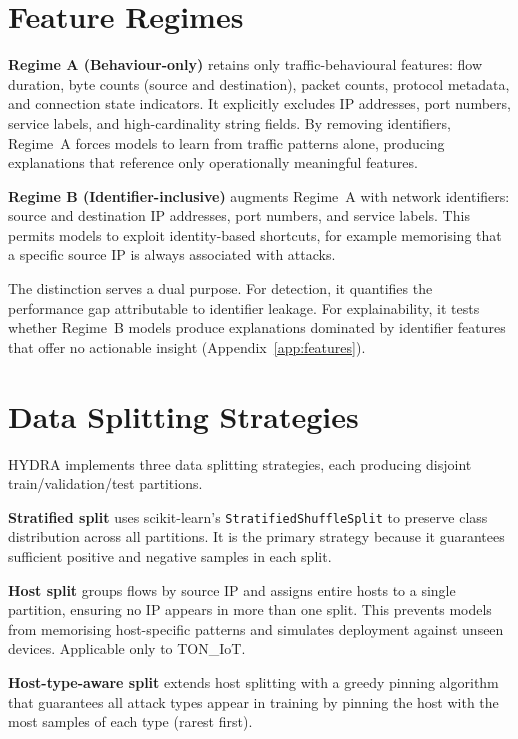 \documentclass[12pt,a4paper]{report}
\begin{document}
\section{Feature Regimes}
\label{sec:regimes}

\textbf{Regime A (Behaviour-only)} retains only traffic-behavioural features: flow duration, byte counts (source and destination), packet counts, protocol metadata, and connection state indicators. It explicitly excludes IP addresses, port numbers, service labels, and high-cardinality string fields. By removing identifiers, Regime~A forces models to learn from traffic patterns alone, producing explanations that reference only operationally meaningful features.

\textbf{Regime B (Identifier-inclusive)} augments Regime~A with network identifiers: source and destination IP addresses, port numbers, and service labels. This permits models to exploit identity-based shortcuts, for example memorising that a specific source IP is always associated with attacks.

The distinction serves a dual purpose. For detection, it quantifies the performance gap attributable to identifier leakage. For explainability, it tests whether Regime~B models produce explanations dominated by identifier features that offer no actionable insight (Appendix~\ref{app:features}).

\section{Data Splitting Strategies}
\label{sec:splitting}

HYDRA implements three data splitting strategies, each producing disjoint train/validation/test partitions.

\textbf{Stratified split} uses scikit-learn's \texttt{StratifiedShuffleSplit} to preserve class distribution across all partitions. It is the primary strategy because it guarantees sufficient positive and negative samples in each split.

\textbf{Host split} groups flows by source IP and assigns entire hosts to a single partition, ensuring no IP appears in more than one split. This prevents models from memorising host-specific patterns and simulates deployment against unseen devices. Applicable only to TON\_IoT.

\textbf{Host-type-aware split} extends host splitting with a greedy pinning algorithm that guarantees all attack types appear in training by pinning the host with the most samples of each type (rarest first).
\end{document}
